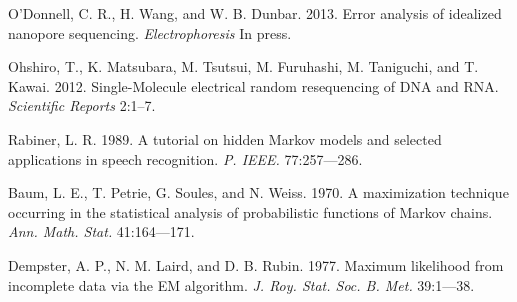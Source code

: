 \documentclass{biophys_letter}
\begin{document}
\begin{thebibliography}{99}
  O'Donnell, C. R., H. Wang, and W. B. Dunbar.
  2013.
  Error analysis of idealized nanopore sequencing.
  {\it Electrophoresis}
  In press.

  Ohshiro, T., K. Matsubara, M. Tsutsui, M. Furuhashi, M. Taniguchi, and T. Kawai.
  2012.
  Single-Molecule electrical random resequencing of DNA and RNA.
  {\it Scientific Reports}
  2:1--7.

  Rabiner, L. R.
  1989.
  A tutorial on hidden Markov models and selected applications in speech recognition.
  {\it P. IEEE.}
  77:257---286.

  Baum, L. E., T. Petrie, G. Soules, and N. Weiss.
  1970.
  A maximization technique occurring in the statistical analysis of probabilistic functions of Markov chains.
  {\it Ann. Math. Stat.}
  41:164---171.

  Dempster, A. P., N. M. Laird, and D. B. Rubin.
  1977.
  Maximum likelihood from incomplete data via the EM algorithm.
  {\it J. Roy. Stat. Soc. B. Met.}
  39:1---38.

\end{thebibliography}
\end{document}
